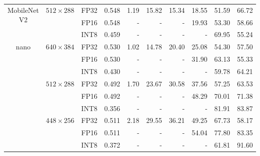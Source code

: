 \begin{appendices}
\begin{table}[h]
\begin{tabular}{|c|c|c|c|rrrrrr|}
        \hline
        \multirow{3}{*}{\parbox{1.6cm}{\centering MobileNet\\V2}} & \multirow{3}{*}{$512 \times 288$} & FP32 & 0.548 &  1.19 &  15.82 & 15.34 & 18.55 & 51.59 &  66.72 \\
                                                                  &                                   & FP16 & 0.548 &     - &      - &     - & 19.93 & 53.30 &  58.66 \\
                                                                  &                                   & INT8 & 0.459 &     - &      - &     - &     - & 69.95 &  55.24 \\
        \hline
        \multirow{9}{*}{nano}                                     & \multirow{3}{*}{$640 \times 384$} & FP32 & 0.530 &  1.02 &  14.78 & 20.40 & 25.08 & 54.30 &  57.50 \\
                                                                  &                                   & FP16 & 0.530 &     - &      - &     - & 31.90 & 63.13 &  55.33 \\
                                                                  &                                   & INT8 & 0.430 &     - &      - &     - &     - & 59.78 &  64.21 \\
        \cline{2-10}
                                                                  & \multirow{3}{*}{$512 \times 288$} & FP32 & 0.492 &  1.70 &  23.67 & 30.58 & 37.56 & 57.25 &  63.53 \\
                                                                  &                                   & FP16 & 0.492 &     - &      - &     - & 48.29 & 70.01 &  71.38 \\
                                                                  &                                   & INT8 & 0.356 &     - &      - &     - &     - & 81.91 &  83.87 \\
        \cline{2-10}
                                                                  & \multirow{3}{*}{$448 \times 256$} & FP32 & 0.511 &  2.18 &  29.55 & 36.21 & 49.25 & 67.73 &  58.17 \\
                                                                  &                                   & FP16 & 0.511 &     - &      - &     - & 54.04 & 77.80 &  83.35 \\
                                                                  &                                   & INT8 & 0.372 &     - &      - &     - &     - & 61.81 &  91.60 \\

\end{tabular}
\end{table}
\end{appendices}
